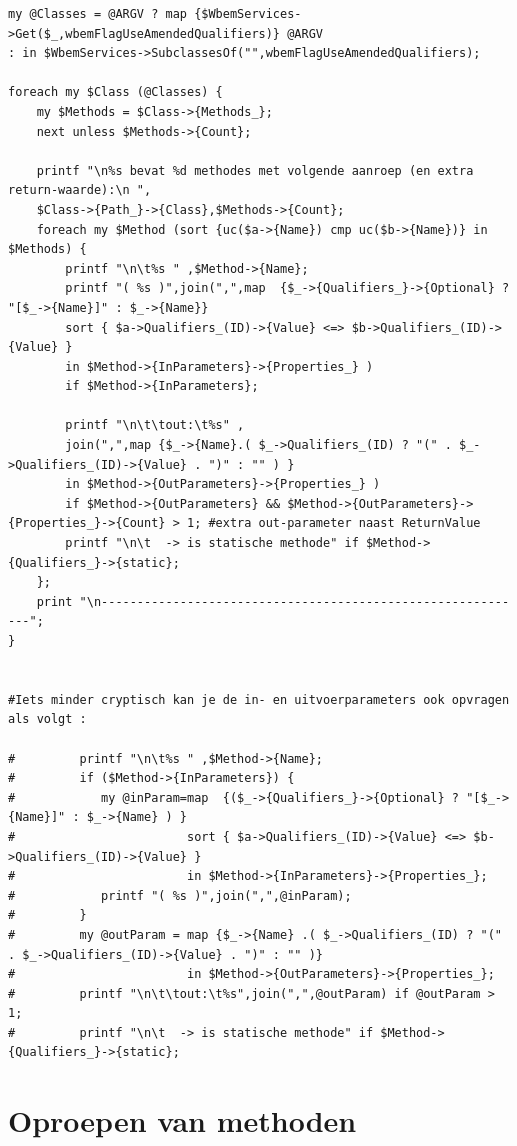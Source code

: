 \documentclass[11pt,a4paper]{report}
\begin{document}
\begin{enumerate}[resume]
\begin{lstlisting}
my @Classes = @ARGV ? map {$WbemServices->Get($_,wbemFlagUseAmendedQualifiers)} @ARGV  
: in $WbemServices->SubclassesOf("",wbemFlagUseAmendedQualifiers);

foreach my $Class (@Classes) {
	my $Methods = $Class->{Methods_};
	next unless $Methods->{Count};
	
	printf "\n%s bevat %d methodes met volgende aanroep (en extra return-waarde):\n ", 
	$Class->{Path_}->{Class},$Methods->{Count};
	foreach my $Method (sort {uc($a->{Name}) cmp uc($b->{Name})} in $Methods) {
		printf "\n\t%s " ,$Method->{Name};
		printf "( %s )",join(",",map  {$_->{Qualifiers_}->{Optional} ? "[$_->{Name}]" : $_->{Name}}
		sort { $a->Qualifiers_(ID)->{Value} <=> $b->Qualifiers_(ID)->{Value} }
		in $Method->{InParameters}->{Properties_} )
		if $Method->{InParameters};
		
		printf "\n\t\tout:\t%s" ,
		join(",",map {$_->{Name}.( $_->Qualifiers_(ID) ? "(" . $_->Qualifiers_(ID)->{Value} . ")" : "" ) }
		in $Method->{OutParameters}->{Properties_} )
		if $Method->{OutParameters} && $Method->{OutParameters}->{Properties_}->{Count} > 1; #extra out-parameter naast ReturnValue
		printf "\n\t  -> is statische methode" if $Method->{Qualifiers_}->{static};   
	};
	print "\n------------------------------------------------------------";
}


#Iets minder cryptisch kan je de in- en uitvoerparameters ook opvragen als volgt :

#         printf "\n\t%s " ,$Method->{Name};
#         if ($Method->{InParameters}) {
#            my @inParam=map  {($_->{Qualifiers_}->{Optional} ? "[$_->{Name}]" : $_->{Name} ) }
#                        sort { $a->Qualifiers_(ID)->{Value} <=> $b->Qualifiers_(ID)->{Value} }
#                        in $Method->{InParameters}->{Properties_};
#            printf "( %s )",join(",",@inParam);
#         }
#         my @outParam = map {$_->{Name} .( $_->Qualifiers_(ID) ? "(" . $_->Qualifiers_(ID)->{Value} . ")" : "" )}
#                        in $Method->{OutParameters}->{Properties_};
#         printf "\n\t\tout:\t%s",join(",",@outParam) if @outParam > 1;
#         printf "\n\t  -> is statische methode" if $Method->{Qualifiers_}->{static};
	\end{lstlisting}
\end{enumerate}
\section{Oproepen van methoden}
\end{document}
